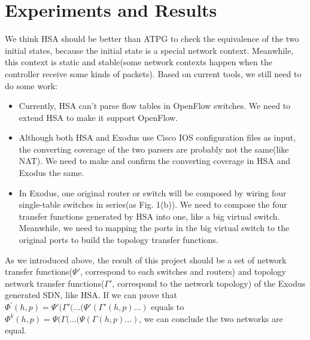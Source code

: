 \documentclass[11pt]{article}
\begin{document}
\section{Experiments and Results}
\par We think HSA should be better than ATPG to check the equivalence of the two initial states, because the initial state is a special network context. Meanwhile, this context is static and stable(some network contexts happen when the controller receive some kinds of packets). Based on current tools, we still need to do some work: 
\begin{itemize}
\item Currently, HSA can't parse flow tables in OpenFlow switches. We need to extend HSA to make it support OpenFlow.
\item Although both HSA and Exodus use Cisco IOS configuration files as input, the converting coverage of the two parsers are probably not the same(like NAT). We need to make and confirm the converting coverage in HSA and Exodus the same.
\item In Exodus, one original router or switch will be composed by wiring four single-table switches in series(as Fig. 1(b)). We need to compose the four transfer functions generated by HSA into one, like a big virtual switch. Meanwhile, we need to mapping the ports in the big virtual switch to the original ports to build the topology transfer functions. 
\end{itemize}

\par As we introduced above, the result of this project should be a set of network transfer functions($\Psi'$, correspond to each switches and routers) and topology network transfer functions($\Gamma'$, correspond to the network topology) of the Exodus generated SDN, like HSA. If we can prove that $\Phi^{'}(h,p)=\Psi'(\Gamma'(...(\Psi'(\Gamma'(h,p)...)$ equals to $\Phi^{k}(h,p)=\Psi(\Gamma(...(\Psi(\Gamma(h,p)...)$, we can conclude the two networks are equal.



\end{document}
